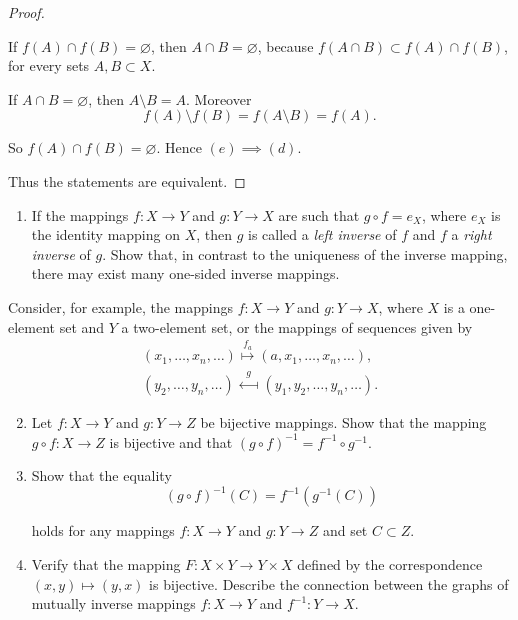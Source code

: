 \begin{proof}
\begin{itemize}
              If $f(A) \cap f(B) = \varnothing$, then $A\cap B = \varnothing$, because $f(A\cap B)\subset f(A)\cap f(B)$, for every sets $A, B\subset X$.

              If $A\cap B = \varnothing$, then $A\setminus B = A$. Moreover
              \[
                  f(A)\setminus f(B) = f(A\setminus B) = f(A).
              \]

              So $f(A)\cap f(B) = \varnothing$. Hence $(e)\implies (d)$.
    \end{itemize}

    \bigskip
    Thus the statements are equivalent.
\end{proof}
\newpage

\begin{exercise}
    \begin{enumerate}[label={(\alph*)}]
        \item If the mappings $f: X\to Y$ and $g: Y\to X$ are such that $g\circ f = e_{X}$, where $e_{X}$ is the identity mapping on $X$, then $g$ is called a \textit{left inverse} of $f$ and $f$ a \textit{right inverse} of $g$. Show that, in contrast to the uniqueness of the inverse mapping, there
              may exist many one-sided inverse mappings.
    \end{enumerate}

    Consider, for example, the mappings $f: X \to Y$ and $g: Y \to X$, where $X$ is a one-element set and $Y$ a two-element set, or the mappings of sequences given by
    \begin{align*}
        (x_{1}, \ldots, x_{n}, \ldots) \stackrel{f_{a}}{\longmapsto} (a, x_{1}, \ldots, x_{n}, \ldots), \\
        (y_{2}, \ldots, y_{n}, \ldots) \stackrel{g}{\longmapsfrom} (y_{1}, y_{2}, \ldots, y_{n}, \ldots).
    \end{align*}
    \begin{enumerate}[label={(\alph*)}]
        \setcounter{enumi}{1}
        \item Let $f: X\to Y$ and $g: Y\to Z$ be bijective mappings. Show that the mapping $g\circ f: X\to Z$ is bijective and that ${(g\circ f)}^{-1} = f^{-1}\circ g^{-1}$.
        \item Show that the equality
              \[
                  {(g\circ f)}^{-1}(C) = f^{-1}(g^{-1}(C))
              \]

              holds for any mappings $f: X\to Y$ and $g: Y\to Z$ and set $C\subset Z$.
        \item Verify that the mapping $F: X\times Y\to Y\times X$ defined by the correspondence $(x, y)\mapsto (y, x)$ is bijective. Describe the connection between the graphs of mutually inverse mappings $f: X\to Y$ and $f^{-1}: Y\to X$.
    \end{enumerate}
\end{exercise}

